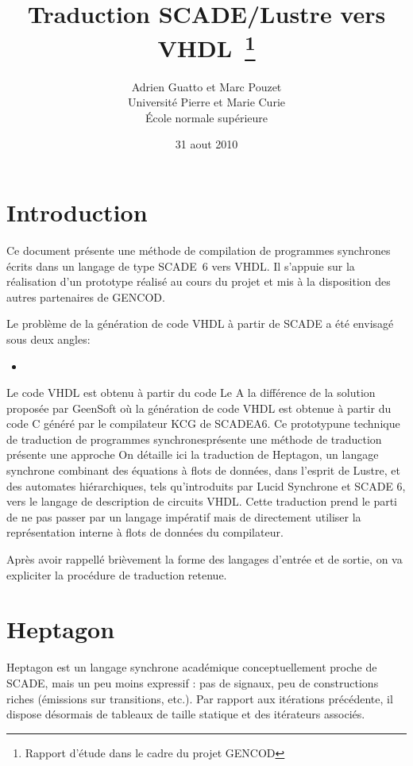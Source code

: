 \documentclass[a4paper]{article}
\title{Traduction SCADE/Lustre vers VHDL~\thanks{Rapport d'\'etude dans
    le cadre du projet GENCOD}}
\author{Adrien Guatto et Marc Pouzet
  \\ Universit\'e Pierre et Marie Curie \\
     \'Ecole normale sup\'erieure}
\date{31 aout 2010}
\newcommand{\LANG}{Heptagon}
\begin{document}
\maketitle

\section{Introduction}
Ce document pr\'esente une m\'ethode de compilation de programmes synchrones
\'ecrits dans un langage de type SCADE~6 vers VHDL. Il s'appuie sur la r\'ealisation
d'un prototype r\'ealis\'e au cours du projet et mis \`a la disposition des
autres partenaires de GENCOD. 

Le probl\`eme de la g\'en\'eration de code VHDL \`a partir de SCADE a \'et\'e envisag\'e sous
deux angles:
\begin{itemize}
\item
\end{itemize}

Le code VHDL est obtenu \`a partir du code Le A la diff\'erence de la solution propos\'ee par GeenSoft o\`u la g\'en\'eration de
code VHDL est obtenue \`a partir du code C g\'en\'er\'e par le compilateur KCG de
SCADEA6. Ce prototypune technique de traduction de programmes synchronespr\'esente une m\'ethode de traduction pr\'esente une approche 
On d\'etaille ici la traduction de \LANG{}, un langage synchrone combinant des
\'equations \`a flots de donn\'ees, dans l'esprit de Lustre, et des automates
hi\'erarchiques, tels qu'introduits par Lucid Synchrone et SCADE 6, vers le
langage de description de circuits VHDL. Cette traduction prend le parti de ne
pas passer par un langage imp\'eratif mais de directement utiliser la
repr\'esentation interne \`a flots de donn\'ees du compilateur.

Apr\`es avoir rappell\'e bri\`evement la forme des langages d'entr\'ee et de sortie, on
va expliciter la proc\'edure de traduction retenue.

\section{\LANG{}}

\LANG{} est un langage synchrone acad\'emique conceptuellement proche de SCADE,
mais un peu moins expressif : pas de signaux, peu de constructions riches
(\'emissions sur transitions, etc.). Par rapport aux it\'erations pr\'ec\'edente, il
dispose d\'esormais de tableaux de taille statique et des it\'erateurs associ\'es.
\end{document}
